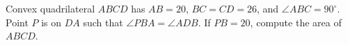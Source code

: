 Convex quadrilateral $ABCD$ has $AB=20$, $BC=CD=26$, and $\angle{ABC}=90^\circ$. Point $P$ is on $DA$ such that $\angle{PBA}=\angle{ADB}$. If $PB=20$, compute the area of $ABCD$.
